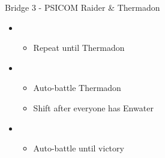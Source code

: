 \begin{multicols}{2}
\begin{battle}{Bridge 3 - PSICOM Raider \& Thermadon}
\begin{itemize}
\begin{itemize}
        \item Repeat Thermadon
    \end{itemize}
    \item \fourth
    \begin{itemize}
        \item Repeat until Thermadon \stagger
    \end{itemize}
    \item \first
    \begin{itemize}
        \item Auto-battle Thermadon
        \item Shift after everyone has Enwater
    \end{itemize}
    \item \fifth
    \begin{itemize}
        \item Auto-battle until victory
    \end{itemize}
\end{itemize}
  
\end{battle}


\end{multicols}
